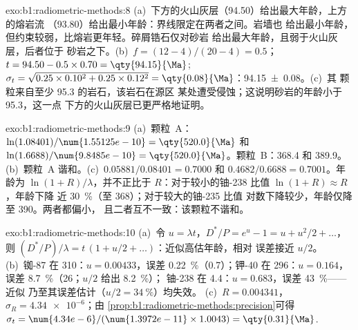 \begin{solution}{exo:b1:radiometric-methods:8}
(a)~下方的火山灰层（\qty{94.50}{\Ma}）给出最大年龄，上方的熔岩流
（\qty{93.80}{\Ma}）给出最小年龄：界线限定在两者之间。岩墙也
给出最小年龄，但约束较弱，比熔岩更年轻。碎屑锆石仅对砂岩
给出最大年龄，且弱于火山灰层，后者位于
砂岩之下。(b)~$f = (12 - 4)/(20 - 4) = 0.5$；$t = 94.50 - 0.5 \times 0.70 =
\qty{94.15}{\Ma}$; $\sigma_t = \sqrt{0.25 \times 0.10^2 + 0.25 \times 0.12^2} =
\qty{0.08}{\Ma}$：\qty[uncertainty-mode=separate]{94.15(8)}{\Ma}。(c)~其
颗粒来自至少 \qty{95.3}{\Ma} 的岩石，该岩石在源区
某处遭受侵蚀；这说明砂岩的年龄小于 \qty{95.3}{\Ma}，这一点
下方的火山灰层已更严格地证明。
\end{solution}

\begin{solution}{exo:b1:radiometric-methods:9}
(a)~颗粒~A：$\ln(1.08401)/\num{1.55125e-10} = \qty{520.0}{\Ma}$ 和
$\ln(1.6688)/\num{9.8485e-10} = \qty{520.0}{\Ma}$。颗粒~B：\qty{368.4}{\Ma} 和
\qty{389.9}{\Ma}。(b)~颗粒~A 谐和。(c)~$0.05881/0.08401 = 0.7000$ 和
$0.4682/0.6688 = 0.7001$。年龄为 $\ln(1 + R)/\lambda$，并不正比于
$R$：对于较小的铀-238 比值 $\ln(1+R) \approx R$，年龄下降
近 \qty{30}{\percent}（至 \qty{368}{\Ma}）；对于较大的铀-235 比值
对数下降较少，年龄仅降至 \qty{390}{\Ma}。两者都偏小，
且二者互不一致：该颗粒不谐和。
\end{solution}

\begin{solution}{exo:b1:radiometric-methods:10}
(a)~令 $u = \lambda t$，$D^*/P = e^u - 1 = u + u^2/2 + \dots$，则 $(D^*/P)/\lambda
= t\,(1 + u/2 + \dots)$：近似高估年龄，相对
误差接近 $u/2$。(b)~铷-87 在 \qty{310}{\Ma}：$u = 0.00433$，误差
\qty{0.22}{\percent}（\qty{0.7}{\Ma}）；钾-40 在 \qty{296}{\Ma}：$u =
0.164$，误差 \qty{8.7}{\percent}（\qty{26}{\Ma}；$u/2$ 给出 \qty{8.2}{\percent}）；
铀-238 在 \qty{4.4}{\Ga}：$u = 0.683$，误差 \qty{43}{\percent}——近似
乃至其误差估计（$u/2 = \qty{34}{\percent}$）均失效。
(c)~$R = 0.004341$，$\sigma_R = \num{4.34e-6}$；由
\cref{prop:b1:radiometric-methods:precision}可得 $\sigma_t =
\num{4.34e-6}/(\num{1.3972e-11} \times 1.0043) = \qty{0.31}{\Ma}$.
\end{solution}

